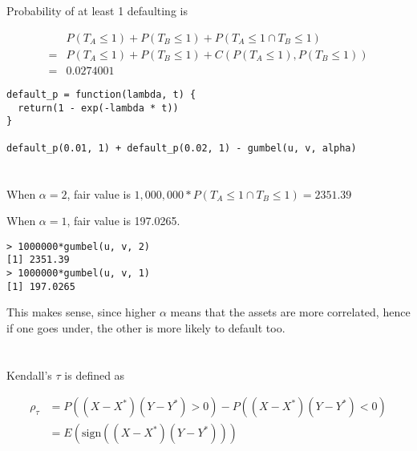 \documentclass[11pt]{scrartcl}
\newcommand{\sign}{\ensuremath{\mathrm{sign}}}
\newcommand{\kt}{\ensuremath{\rho_\tau}}
\begin{document}
\subsection{}

Probability of at least 1 defaulting is

\begin{align*}
&P(T_A \leq 1) + P(T_B \leq 1) + P(T_A \leq 1 \cap T_B \leq 1) \\
= &P(T_A \leq 1) + P(T_B \leq 1) + C(P(T_A \leq 1), P(T_B \leq 1)) \\
= &0.0274001
\end{align*}

\begin{lstlisting}
default_p = function(lambda, t) {
  return(1 - exp(-lambda * t))
}

default_p(0.01, 1) + default_p(0.02, 1) - gumbel(u, v, alpha)
\end{lstlisting}

\section{}

When $\alpha = 2$, fair value is $1,000,000 * P(T_A \leq 1 \cap T_B \leq 1) = 2351.39$

When $\alpha = 1$, fair value is 197.0265.

\begin{lstlisting}
> 1000000*gumbel(u, v, 2)
[1] 2351.39
> 1000000*gumbel(u, v, 1)
[1] 197.0265
\end{lstlisting}

This makes sense, since higher $\alpha$ means that the assets are more correlated, hence if one goes under, the other is more likely to default too.

\section{}

Kendall's $\tau$ is defined as

\begin{align*}
\kt &= P((X - X^*)(Y - Y^*) > 0) - P((X-X^*)(Y - Y^*) < 0) \\
&= E(\sign((X-X^*)(Y-Y^*)))
\end{align*}

\subsection{}
\end{document}
